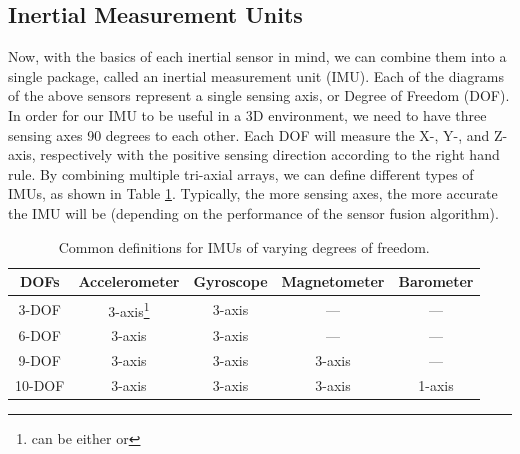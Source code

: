 \subsection{Inertial Measurement Units}
Now, with the basics of each inertial sensor in mind, we can combine them into a single package, called an inertial measurement unit (IMU).
Each of the diagrams of the above sensors represent a single sensing axis, or Degree of Freedom (DOF).
In order for our IMU to be useful in a 3D environment, we need to have three sensing axes 90 degrees to each other.
Each DOF will measure the X-, Y-, and Z-axis, respectively with the positive sensing direction according to the right hand rule.
By combining multiple tri-axial arrays, we can define different types of IMUs, as shown in Table \ref{tab:imu_dofs}.
Typically, the more sensing axes, the more accurate the IMU will be (depending on the performance of the sensor fusion algorithm).

\begin{table}[h]
    \caption{Common definitions for IMUs of varying degrees of freedom.}
    \label{tab:imu_dofs}
    \centering
    \begin{tabular}{| c | c | c | c | c |}
        \hline
        DOFs & Accelerometer & Gyroscope & Magnetometer & Barometer \\
        \hline
        3-DOF & 3-axis\footnote[2]{can be either or} & 3-axis\footnote[2] & --- & --- \\
        6-DOF & 3-axis & 3-axis & --- & --- \\
        9-DOF & 3-axis & 3-axis & 3-axis & --- \\
        10-DOF & 3-axis & 3-axis & 3-axis & 1-axis \\
        \hline
    \end{tabular}
\end{table}

